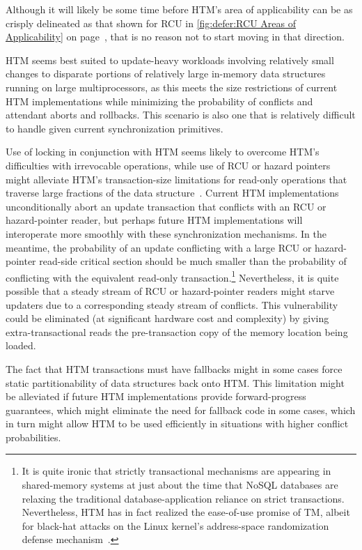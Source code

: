 Although it will likely be some time before HTM's area of applicability
can be as crisply delineated as that shown for RCU in
\cref{fig:defer:RCU Areas of Applicability} on
page~\pageref{fig:defer:RCU Areas of Applicability}, that is no reason not to
start moving in that direction.

HTM seems best suited to update-heavy workloads involving relatively
small changes to disparate portions of relatively large in-memory
data structures running on large multiprocessors,
as this meets the size restrictions of current HTM implementations while
minimizing the probability of conflicts and attendant aborts and
rollbacks.
This scenario is also one that is relatively difficult to handle given
current synchronization primitives.

Use of locking in conjunction with HTM seems likely to overcome HTM's
difficulties with irrevocable operations, while use of RCU or
hazard pointers might alleviate HTM's transaction-size limitations
for read-only operations that traverse large fractions of the data
structure~\cite{SeongJaePark2020HTMRCUlock}.
Current HTM implementations unconditionally abort an update transaction
that conflicts with an RCU or hazard-pointer reader, but perhaps future
HTM implementations will interoperate more smoothly with these
synchronization mechanisms.
In the meantime, the probability of an update conflicting with a
large RCU or hazard-pointer read-side critical section should be
much smaller than the probability of conflicting with the equivalent
read-only transaction.\footnote{
	It is quite ironic that strictly transactional mechanisms are
	appearing in shared-memory systems at just about the time
	that NoSQL databases are relaxing the traditional
	database-application reliance on strict transactions.
	Nevertheless, HTM has in fact realized the ease-of-use promise
	of TM, albeit for black-hat attacks on the Linux kernel's
	address-space randomization defense
	mechanism~\cite{YeongjinJang2016TSXbreakKASLR,Jang:2016:BKA:2976749.2978321}.}
Nevertheless, it is quite possible that a steady stream of RCU or
hazard-pointer readers might starve updaters due to a corresponding
steady stream of conflicts.
This vulnerability could be eliminated (at significant
hardware cost and complexity) by giving extra-transactional
reads the pre-transaction copy of the memory location being loaded.

The fact that HTM transactions must have fallbacks might in some cases
force static partitionability of data structures back onto HTM\@.
This limitation might be alleviated if future HTM implementations
provide forward-progress guarantees, which might eliminate the need
for fallback code in some cases, which in turn might allow HTM to
be used efficiently in situations with higher conflict probabilities.

